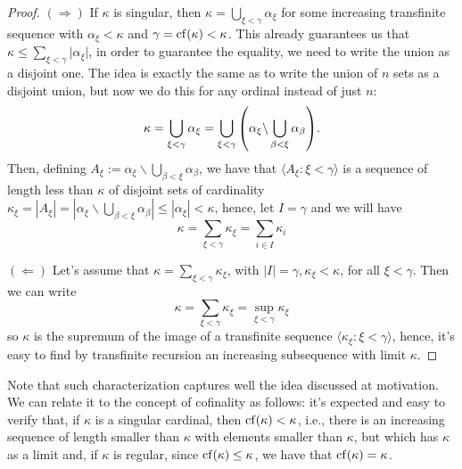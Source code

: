 \begin{proof}
    $(\Rightarrow)$ If $\kappa$ is singular, then $\kappa=\bigcup_{\xi<\gamma}\alpha_\xi$ for some increasing transfinite sequence with $\alpha_\xi<\kappa$ and $\gamma=\mathrm{cf}\!\left(\kappa\right)<\kappa$. This already guarantees us that $\kappa\leq\sum_{\xi<\gamma}\lvert\alpha_\xi\rvert$, in order to guarantee the equality, we need to write the union as a disjoint one. The idea is exactly the same as to write the union of $n$ sets as a disjoint union, but now we do this for any ordinal instead of just $n$:
    $$\kappa=\bigcup_{\xi<\gamma}\alpha_\xi=\bigcup_{\xi<\gamma}{\left(\alpha_\xi\backslash\bigcup_{\beta<\xi}\alpha_\beta\right)}.$$
    Then, defining $A_\xi:=\alpha_\xi\backslash\bigcup_{\beta<\xi}\alpha_\beta$, we have that $\langle A_\xi:\xi<\gamma\rangle$ is a sequence of length less than $\kappa$ of disjoint sets of cardinality $\kappa_\xi=|A_\xi|=\left|\alpha_\xi\backslash\bigcup_{\beta<\xi}\alpha_\beta\right|\leq|\alpha_\xi|<\kappa$, hence, let $I=\gamma$ and we will have
    $$\kappa=\sum_{\xi<\gamma}\kappa_\xi=\sum_{i\in I}\kappa_i$$
    
    $(\Leftarrow)$ Let's assume that $\kappa=\sum_{\xi<\gamma}\kappa_\xi$, with $\lvert I\rvert=\gamma,\kappa_\xi<\kappa$, for all $\xi<\gamma$. Then we can write
    $$\kappa=\sum_{\xi<\gamma}\kappa_\xi=\sup_{\xi<\gamma}\kappa_\xi$$
    so $\kappa$ is the supremum of the image of a transfinite sequence $\langle\kappa_\xi:\xi<\gamma\rangle$, hence, it's easy to find by transfinite recursion an increasing subsequence with limit $\kappa$.
\end{proof}

Note that such characterization captures well the idea discussed at motivation. We can relate it to the concept of cofinality as follows: it's expected and easy to verify that, if $\kappa$ is a singular cardinal, then $\mathrm{cf}\!\left(\kappa\right)<\kappa$, i.e., there is an increasing sequence of length smaller than $\kappa$ with elements smaller than $\kappa$, but which has $\kappa$ as a limit and, if $\kappa$ is regular, since $\mathrm{cf}\!\left(\kappa\right)\leq\kappa$, we have that $\mathrm{cf}\!\left(\kappa\right)=\kappa$.